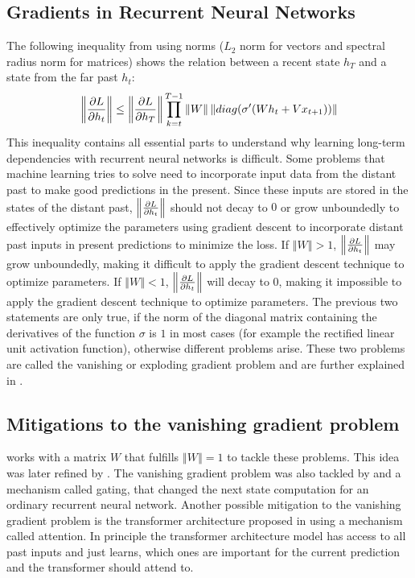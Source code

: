 \documentclass{article}
\begin{document}
    \subsection{Gradients in Recurrent Neural Networks}
    The following inequality from \cite{UnitaryRNNs} using norms ($L_2$ norm for vectors and spectral radius norm for matrices) shows the relation between a recent state $h_T$ and a state from the far past $h_t$:
    \begin{align}
        \left\Vert \pdv{L}{h_t} \right\Vert \leq \left\Vert \pdv{L}{h_T} \right\Vert \prod^{T-1}_{k=t} \left\Vert W \right\Vert \left\Vert diag(\sigma'(Wh_t + Vx_{t+1})) \right\Vert
    \end{align}
    This inequality contains all essential parts to understand why learning long-term dependencies with recurrent neural networks is difficult.
    Some problems that machine learning tries to solve need to incorporate input data from the distant past to make good predictions in the present.
    Since these inputs are stored in the states of the distant past, $\left\Vert \pdv{L}{h_t} \right\Vert$ should not decay to $0$ or grow unboundedly to effectively optimize the parameters using gradient descent to incorporate distant past inputs in present predictions to minimize the loss.
    If $\left\Vert W \right\Vert > 1$, $\left\Vert \pdv{L}{h_t} \right\Vert$ may grow unboundedly, making it difficult to apply the gradient descent technique to optimize parameters.
    If $\left\Vert W \right\Vert < 1$, $\left\Vert \pdv{L}{h_t} \right\Vert$ will decay to $0$, making it impossible to apply the gradient descent technique to optimize parameters.
    The previous two statements are only true, if the norm of the diagonal matrix containing the derivatives of the function $\sigma$ is $1$ in most cases (for example the rectified linear unit activation function), otherwise different problems arise.
    These two problems are called the vanishing or exploding gradient problem and are further explained in \cite{LongTermDependenciesGradientDescent}.

    \subsection{Mitigations to the vanishing gradient problem}
    \cite{UnitaryRNNs} works with a matrix $W$ that fulfills $\left\Vert W \right\Vert = 1$ to tackle these problems.
    This idea was later refined by \cite{EfficientUnitaryRNNs}.
    The vanishing gradient problem was also tackled by \cite{LSTM} and a mechanism called gating, that changed the next state computation for an ordinary recurrent neural network.
    Another possible mitigation to the vanishing gradient problem is the transformer architecture proposed in \cite{Transformer} using a mechanism called attention.
    In principle the transformer architecture model has access to all past inputs and just learns, which ones are important for the current prediction and the transformer should attend to.
\end{document}

